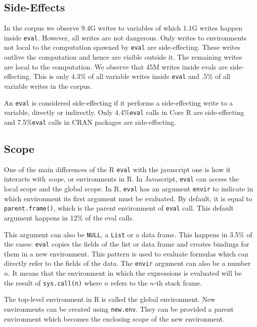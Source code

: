 \documentclass[USenglish,cleveref, autoref, thm-restate]{lipics-v2019}
\newcommand{\AllWritesRnd}{9.4G\xspace}
\newcommand{\EvalWritesRnd}{1.1G\xspace}
\newcommand{\EvalSideEffectingWritesRnd}{45M\xspace}
\newcommand{\EvalSideEffectingWritesEvalPerc}{4.3\%\xspace}
\newcommand{\EvalSideEffectingWritesAllPerc}{.5\%\xspace}
\newcommand{\SideEffectingCoreCallPerc}{4.4\%\xspace}
\newcommand{\SideEffectingPackageCallPerc}{7.5\%\xspace}
\newcommand{\DefaultEnvirExprPercent}{12\%\xspace}
\newcommand{\eval}{\texttt{eval}\xspace}
\renewcommand{\c}[1]{\lstinline{#1}\xspace}
\begin{document}
\subsection{Side-Effects}

In the corpus we observe \AllWritesRnd writes to variables of which
\EvalWritesRnd writes happen inside \eval. However, all writes are not
dangerous. Only writes to environments not local to the computation spawned
by \eval are side-effecting. These writes outlive the computation and hence
are visible outside it. The remaining writes are local to the
computation. We observe that \EvalSideEffectingWritesRnd writes inside evals
are side-effecting. This is only \EvalSideEffectingWritesEvalPerc of all
variable writes inside \eval and \EvalSideEffectingWritesAllPerc of all
variable writes in the corpus.

An \eval is considered side-effecting if it performs a side-effecting write to a
variable, directly or indirectly. Only \SideEffectingCoreCallPerc \eval calls in
Core R are side-effecting and \SideEffectingPackageCallPerc \eval calls in CRAN
packages are side-effecting.

\subsection{Scope}

One of the main differences of the R \eval with the javascript one is how it
interacts with \emph{scope}, or environments in R. In Javascript, \eval can
access the local scope and the global scope. In R, \eval has an argument
\c{envir} to indicate in which environment its first argument must be evaluated.
By default, it is equal to \c{parent.frame()}, 
which is the parent environment of \eval call. This default argument
happens in \DefaultEnvirExprPercent of the eval calls.

This argument can also be \c{NULL}, a \c{List} or a data frame. This happens
in 3.5\% of the cases: \eval copies the fields of the list or data frame
and creates bindings for them in a new environment. This pattern is used to
evaluate formulas which can directly refer to the fields of the data.  The
\c{envir} argument can also be a number $n$. It means that the environment
in which the expressions is evaluated will be the result of \c{sys.call(n)}
where $n$ refers to the $n$-th stack frame.

The top-level environment in R is called the global environment. New
environments can be created using \c{new.env}. They can be provided a parent
environment which becomes the enclosing scope of the new environment.
\end{document}
